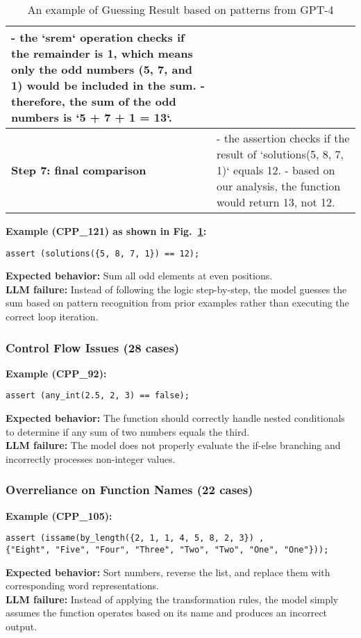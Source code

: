 \begin{table}[h]
\begin{tabular}{|m{6cm}|m{10cm}|}
        - the `srem` operation checks if the remainder is 1, which means only the odd numbers (5, 7, and 1) would be included in the sum.\newline
        - therefore, the sum of the odd numbers is `5 + 7 + 1 = 13`.\\
        \hline
        \textbf{Step 7: final comparison}&
        - the assertion checks if the result of `solutions({5, 8, 7, 1})` equals 12.\newline
        - based on our analysis, the function would return 13, not 12.\\
        \hline
    \end{tabular}
    \caption{An example of Guessing Result based on patterns from GPT-4}
    \label{tab:An example of Guessing Result based on patterns from GPT-4}
\end{table}
\textbf{Example (CPP\_121) as shown in Fig.~\ref{tab:An example of Guessing Result based on patterns from GPT-4}:}
\begin{verbatim}
assert (solutions({5, 8, 7, 1}) == 12);
\end{verbatim}
\textbf{Expected behavior:} Sum all odd elements at even positions.\\ 
\textbf{LLM failure:} Instead of following the logic step-by-step, the model guesses the sum based on pattern recognition from prior examples rather than executing the correct loop iteration.

\subsubsection{Control Flow Issues (28 cases)}
\textbf{Example (CPP\_92):}
\begin{verbatim}
assert (any_int(2.5, 2, 3) == false);
\end{verbatim}
\textbf{Expected behavior:} The function should correctly handle nested conditionals to determine if any sum of two numbers equals the third.\\  
\textbf{LLM failure:} The model does not properly evaluate the if-else branching and incorrectly processes non-integer values.

\subsubsection{Overreliance on Function Names (22 cases)}
\textbf{Example (CPP\_105):}
\begin{verbatim}
assert (issame(by_length({2, 1, 1, 4, 5, 8, 2, 3}) , 
{"Eight", "Five", "Four", "Three", "Two", "Two", "One", "One"}));
\end{verbatim}
\textbf{Expected behavior:} Sort numbers, reverse the list, and replace them with corresponding word representations.\\  
\textbf{LLM failure:} Instead of applying the transformation rules, the model simply assumes the function operates based on its name and produces an incorrect output.


